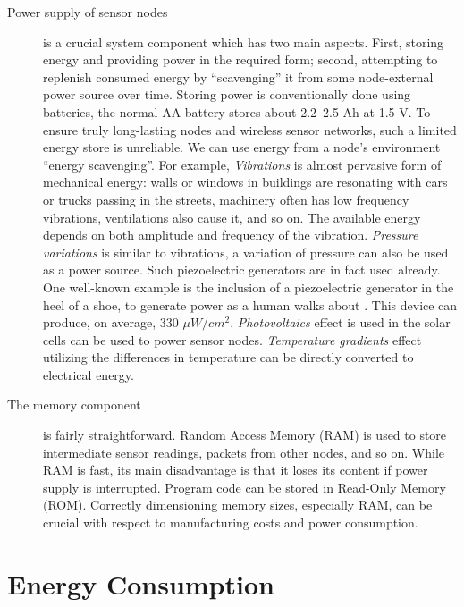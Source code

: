 \begin{description}
	\item[Power supply of sensor nodes] is a crucial system component which has two main aspects.
		First, storing energy and providing power in the required form; second, attempting to replenish consumed energy by ``scavenging'' it from some node-external power source over time.
		Storing power is conventionally done using batteries, the normal AA battery stores about 2.2–2.5 Ah at 1.5 V.
		To ensure truly long-lasting nodes and wireless sensor networks, such a limited energy store is unreliable. 
		We can use energy from a node’s environment ``energy scavenging''.
		For example, \textit{Vibrations} is almost pervasive form of mechanical energy: walls or windows in buildings are resonating with cars or trucks passing in the streets, machinery often has low frequency vibrations, ventilations also cause it, and so on.
		The available energy depends on both amplitude and frequency of the vibration.
		\textit{Pressure variations} is similar to vibrations, a variation of pressure can also be used as a power source. 
		Such piezoelectric generators are in fact used already. 
		One well-known example is the inclusion of a piezoelectric generator in the heel of a shoe, to generate power as a human walks about \cite{shenck2001energy}. 
		This device can produce, on average, 330 $\mu W / cm^{2}$. 
		\textit{Photovoltaics} effect is used in the solar cells can be used to power sensor nodes.
		\textit{Temperature gradients} effect utilizing the differences in temperature can be directly converted to electrical energy.

	\item[The memory component] is fairly straightforward. 
		Random Access Memory (RAM) is used to store intermediate sensor readings, packets from other nodes, and so on. 
		While RAM is fast, its main disadvantage is that it loses its content if power supply is interrupted. 
		Program code can be stored in Read-Only Memory (ROM). 
		Correctly dimensioning memory sizes, especially RAM, can be crucial with respect to manufacturing costs and power consumption.
	\end{description}

\section{Energy Consumption}

